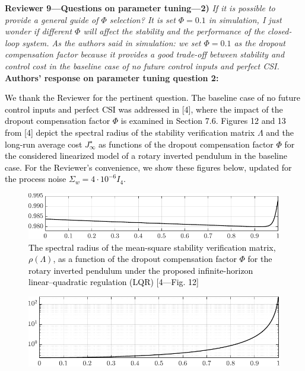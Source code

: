 \textbf{Reviewer 9—Questions on parameter tuning—2)}\textit{ %
If it is possible to provide a general guide of $\mathit{\Phi}$ selection? It is set $\mathit{\Phi}=0.1$ in simulation, I just wonder if different $\mathit{\Phi}$ will affect the stability and the performance of the closed-loop system. 
As the authors said in simulation: we set $\mathit{\Phi}=0.1$ as the dropout compensation factor because it provides a good trade-off between stability and control cost in the baseline case of no future control inputs and perfect CSI.} \\[2mm]
\textbf{Authors' response on parameter tuning question 2:} \textcolor{black}{We thank the Reviewer for the pertinent question. The baseline case of no future control inputs and perfect CSI was addressed in [4], where the impact of the dropout compensation factor $\mathit{\Phi}$ is examined in Section 7.6. Figures 12 and 13 from [4] depict the spectral radius of the stability verification matrix $\mathit{\Lambda}$ and the long-run average cost $J_{\infty}^{\star}$ as functions of the dropout compensation factor $\mathit{\Phi}$ for the considered linearized model of a rotary inverted pendulum in the baseline case. For the Reviewer's convenience, we show these figures below, updated for the process noise $\Sigma_{w}=4\cdot 10^{-6} I_4$. \\
\begin{figure}[h!]
\begin{center}
\includegraphics[width=0.7\columnwidth]{stability-cntrl-2.pdf}
\caption{The spectral radius of the mean-square stability verification matrix, $\rho(\mathit{\Lambda})$, as a function of the dropout compensation factor $\mathit{\Phi}$ for the rotary inverted pendulum under the proposed infinite-horizon linear–quadratic regulation (LQR) [4—Fig. 12]}\label{fig:stability-coeff}
\end{center}
\end{figure}
\begin{figure}[h!]
\begin{center}
\includegraphics[width=0.7\columnwidth]{cost-cntrl-2.pdf}

\end{center}
\end{figure}}
